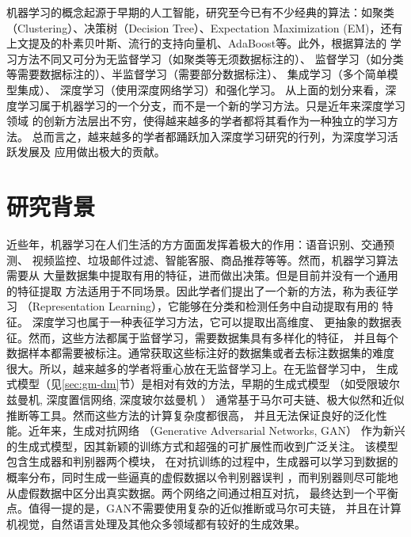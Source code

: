 机器学习的概念起源于早期的人工智能，研究至今已有不少经典的算法：如聚类（Clustering）、决策树（Decision Tree）、Expectation Maximization (EM)，还有上文提及的朴素贝叶斯、流行的支持向量机、AdaBoost等。此外，根据算法的
学习方法不同又可分为无监督学习（如聚类等无须数据标注的）、
监督学习（如分类等需要数据标注的）、半监督学习（需要部分数据标注）、
集成学习（多个简单模型集成）、
深度学习（使用深度网络学习）和强化学习。
从上面的划分来看，深度学习属于机器学习的一个分支，而不是一个新的学习方法。只是近年来深度学习领域
的创新方法层出不穷，使得越来越多的学者都将其看作为一种独立的学习方法。
总而言之，越来越多的学者都踊跃加入深度学习研究的行列，为深度学习活跃发展及
应用做出极大的贡献。

\section{研究背景}
近些年，机器学习在人们生活的方方面面发挥着极大的作用：语音识别、交通预测、
视频监控、垃圾邮件过滤、智能客服、商品推荐等等。然而，机器学习算法需要从
大量数据集中提取有用的特征，进而做出决策。但是目前并没有一个通用的特征提取
方法适用于不同场景。因此学者们提出了一个新的方法，称为表征学习
（Representation Learning），它能够在分类和检测任务中自动提取有用的
特征\cite{bengio2013representation}。
深度学习\cite{lecun2015deep}也属于一种表征学习方法，它可以提取出高维度、
更抽象的数据表征。然而，这些方法都属于监督学习，需要数据集具有多样化的特征，
并且每个数据样本都需要被标注。通常获取这些标注好的数据集或者去标注数据集的难度
很大。所以，越来越多的学者将重心放在无监督学习上。在无监督学习中，
生成式模型（见\ref{sec:gm-dm}节）是相对有效的方法，早期的生成式模型
（如受限玻尔兹曼机\cite{smolensky1986information},
深度置信网络\cite{hinton2006fast}, 深度玻尔兹曼机\cite{salakhutdinov2009deep}
）
通常基于马尔可夫链、极大似然和近似推断等工具。然而这些方法的计算复杂度都很高，
并且无法保证良好的泛化性能。近年来，生成对抗网络
（Generative Adversarial Networks, GAN）\cite{goodfellow2014generative}
作为新兴的生成式模型，因其新颖的训练方式和超强的可扩展性而收到广泛关注。
该模型包含生成器和判别器两个模块，
在对抗训练的过程中，生成器可以学习到数据的概率分布，同时生成一些逼真的虚假数据以令判别器误判
，而判别器则尽可能地从虚假数据中区分出真实数据。两个网络之间通过相互对抗，
最终达到一个平衡点。值得一提的是，GAN不需要使用复杂的近似推断或马尔可夫链，
并且在计算机视觉，自然语言处理及其他众多领域都有较好的生成效果。


